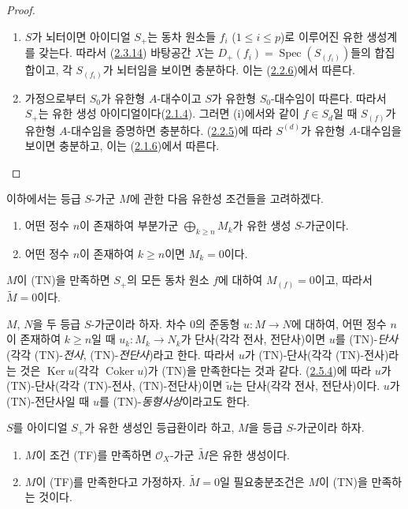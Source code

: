 \begin{proof}
\begin{enumerate}
  \item[\rm(i)] $S$가 뇌터이면 아이디얼 $S_+$는 동차 원소들
    $f_i$ ($1\leq i\leq p$)로 이루어진 유한 생성계를 갖는다. 따라서
    (\hyperref[II.2.3.14-ko]{2.3.14}) 바탕공간 $X$는
    $D_+(f_i)=\operatorname{Spec}(S_{(f_i)})$들의 합집합이고, 각
    $S_{(f_i)}$가 뇌터임을 보이면 충분하다. 이는
    (\hyperref[II.2.2.6-ko]{2.2.6})에서 따른다.
  \item[\rm(ii)] 가정으로부터 $S_0$가 유한형 $A$-대수이고 $S$가
    유한형 $S_0$-대수임이 따른다. 따라서 $S_+$는 유한 생성
    아이디얼이다(\hyperref[II.2.1.4-ko]{2.1.4}). 그러면 (i)에서와 같이
    $f\in S_d$일 때 $S_{(f)}$가 유한형 $A$-대수임을 증명하면
    충분하다. (\hyperref[II.2.2.5-ko]{2.2.5})에 따라 $S^{(d)}$가 유한형
    $A$-대수임을 보이면 충분하고, 이는
    (\hyperref[II.2.1.6-ko]{2.1.6})에서 따른다.
\end{enumerate}
\end{proof}

\begin{env}[2.7.2]
\label{II.2.7.2-ko}
이하에서는 등급 $S$-가군 $M$에 관한 다음 유한성 조건들을 고려하겠다.
\begin{enumerate}
  \item[\rm(TF)] 어떤 정수 $n$이 존재하여 부분가군
    $\bigoplus_{k\geq n}M_k$가 유한 생성 $S$-가군이다.
  \item[\rm(TN)] 어떤 정수 $n$이 존재하여 $k\geq n$이면 $M_k=0$이다.
\end{enumerate}

$M$이 (TN)을 만족하면 $S_+$의 모든 동차 원소 $f$에 대하여
$M_{(f)}=0$이고, 따라서 $\widetilde{M}=0$이다.

$M$, $N$을 두 등급 $S$-가군이라 하자. 차수 $0$의 준동형
$u:M\to N$에 대하여, 어떤 정수 $n$이 존재하여 $k\geq n$일 때
$u_k:M_k\to N_k$가 단사(각각 전사, 전단사)이면 $u$를
(TN)-\emph{단사}(각각 (TN)-\emph{전사}, (TN)-\emph{전단사})라고 한다.
따라서 $u$가 (TN)-단사(각각 (TN)-전사)라는 것은
$\operatorname{Ker}u$(각각 $\operatorname{Coker}u$)가 (TN)을
만족한다는 것과 같다. (\hyperref[II.2.5.4-ko]{2.5.4})에 따라 $u$가
(TN)-단사(각각 (TN)-전사, (TN)-전단사)이면 $\widetilde{u}$는
단사(각각 전사, 전단사)이다. $u$가 (TN)-전단사일 때 $u$를
(TN)-\emph{동형사상}이라고도 한다.
\end{env}

\begin{proposition}[2.7.3]
\label{II.2.7.3-ko}
$S$를 아이디얼 $S_+$가 유한 생성인 등급환이라 하고, $M$을 등급
$S$-가군이라 하자.
\begin{enumerate}
  \item[\rm(i)] $M$이 조건 (TF)를 만족하면 $\mathcal{O}_X$-가군
    $\widetilde{M}$은 유한 생성이다.
  \item[\rm(ii)] $M$이 (TF)를 만족한다고 가정하자. $\widetilde{M}=0$일
    필요충분조건은 $M$이 (TN)을 만족하는 것이다.
\end{enumerate}
\end{proposition}

